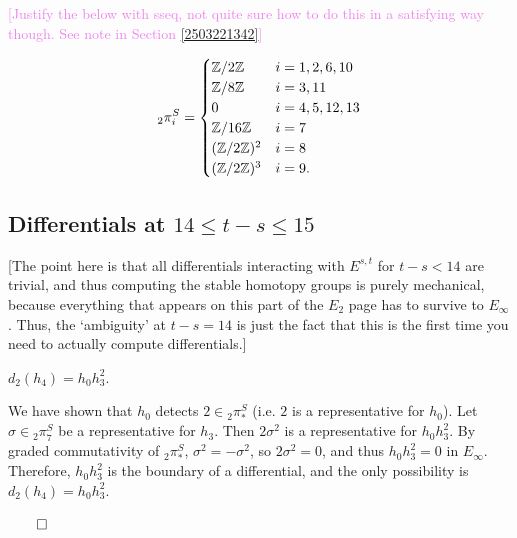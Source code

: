 \documentclass{MetricNotes2023}
\def\bb{\ensuremath\mathbb}
\def\inte{\ensuremath\mathbb{Z}}
\DeclareMathOperator{\Ext}{Ext}
\def\done{\begin{flushright}\vspace{-4.35ex}\(\qed\)\end{flushright}}
\def\textcolour{\textcolor}
\begin{document}

\textcolour{violet}{[Justify the below with sseq, not quite sure how to do this in a satisfying way though. See note in Section \ref{2503221342}]}

\begin{theorem}
\begin{align*}
\text{}_{2}\pi_i^S = \begin{cases}
\inte/2\inte & i = 1, 2, 6,10\\
\inte/8\inte & i = 3, 11\\
0 & i = 4, 5, 12, 13\\
\inte/16\inte & i = 7\\
(\inte/2\inte)^2 & i = 8\\
(\inte/2\inte)^3 & i=9.
\end{cases}
\end{align*}
\end{theorem}

\subsection{Differentials at \(14\leq t-s\leq 15\)}

[The point here is that all differentials interacting with \(E^{s,t}\) for \(t-s<14\) are trivial, and thus computing the stable homotopy groups is purely mechanical, because everything that appears on this part of the \(E_2\) page has to survive to \(E_\infty\). Thus, the `ambiguity' at \(t-s=14\) is just the fact that this is the first time you need to actually compute differentials.]

\begin{theorem}
\(d_2(h_4)=h_0h_3^2\).
\end{theorem}

\begin{ourproof}
We have shown that \(h_0\) detects \(2\in \text{}_2\pi_*^S\) (i.e. \(2\) is a representative for \(h_0\)). Let \(\sigma\in \text{}_2\pi_7^S\) be a representative for \(h_3\). Then \(2 \sigma^2\) is a representative for \(h_0h_3^2\). By graded commutativity of \(\text{}_2\pi_*^S\), \(\sigma^2=-\sigma^2\), so \(2 \sigma^2=0\), and thus \(h_0h_3^2=0\) in \(E_\infty\). Therefore, \(h_0h_3^2\) is the boundary of a differential, and the only possibility is \(d_2(h_4)=h_0h_3^2\).\done
\end{ourproof}
\end{document}
